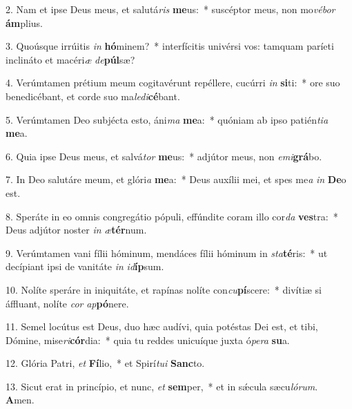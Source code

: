 2. Nam et ipse Deus meus, et salutá\textit{ris} \textbf{me}us:~*  suscéptor meus, non mo\textit{vé}\textit{bor} \textbf{ám}plius.\

3. Quoúsque irrúitis \textit{in} \textbf{hó}minem?~*  interfícitis univérsi vos: tamquam paríeti inclináto et macéri\textit{æ} \textit{de}\textbf{púl}sæ?\

4. Verúmtamen prétium meum cogitavérunt repéllere, cucúrri \textit{in} \textbf{si}ti:~*  ore suo benedicébant, et corde suo ma\textit{le}\textit{di}\textbf{cé}bant.\

5. Verúmtamen Deo subjécta esto, áni\textit{ma} \textbf{me}a:~*  quóniam ab ipso patién\textit{ti}\textit{a} \textbf{me}a.\

6. Quia ipse Deus meus, et salvá\textit{tor} \textbf{me}us:~*  adjútor meus, non \textit{e}\textit{mi}\textbf{grá}bo.\

7. In Deo salutáre meum, et glóri\textit{a} \textbf{me}a:~*  Deus auxílii mei, et spes me\textit{a} \textit{in} \textbf{De}o est.\

8. Speráte in eo omnis congregátio pópuli, effúndite coram illo cor\textit{da} \textbf{ves}tra:~*  Deus adjútor noster \textit{in} \textit{æ}\textbf{tér}num.\

9. Verúmtamen vani fílii hóminum, mendáces fílii hóminum in \textit{sta}\textbf{té}ris:~*  ut decípiant ipsi de vanitáte \textit{in} \textit{id}\textbf{íp}sum.\

10. Nolíte speráre in iniquitáte, et rapínas nolíte con\textit{cu}\textbf{pí}scere:~*  divítiæ si áffluant, nolíte \textit{cor} \textit{ap}\textbf{pó}nere.\

11. Semel locútus est Deus, duo hæc audívi, quia potéstas Dei est, et tibi, Dómine, mise\textit{ri}\textbf{cór}dia:~*  quia tu reddes unicuíque juxta ó\textit{pe}\textit{ra} \textbf{su}a.\

12. Glória Patri, \textit{et} \textbf{Fí}lio,~*  et Spirí\textit{tu}\textit{i} \textbf{Sanc}to.\

13. Sicut erat in princípio, et nunc, \textit{et} \textbf{sem}per,~*  et in sǽcula sæcu\textit{ló}\textit{rum}. \textbf{A}men.\

